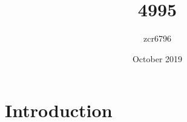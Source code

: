 \documentclass{article}
\title{4995}
\author{zcr6796 }
\date{October 2019}
\begin{document}
\maketitle

\section{Introduction}
\end{document}
